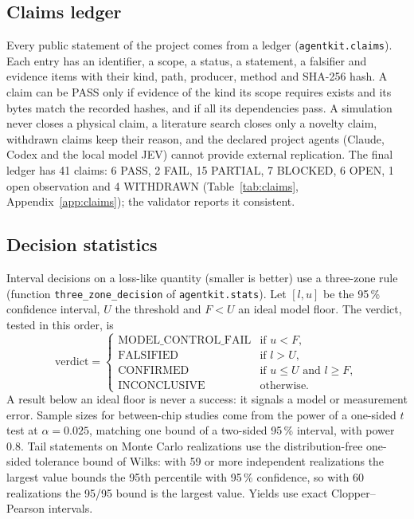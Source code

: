 \documentclass[11pt,a4paper]{article}
\begin{document}
\subsection{Claims ledger}

Every public statement of the project comes from a ledger (\texttt{agentkit.claims}). Each entry has an identifier, a scope, a status, a statement, a falsifier and evidence items with their kind, path, producer, method and SHA-256 hash. A claim can be PASS only if evidence of the kind its scope requires exists and its bytes match the recorded hashes, and if all its dependencies pass. A simulation never closes a physical claim, a literature search closes only a novelty claim, withdrawn claims keep their reason, and the declared project agents (Claude, Codex and the local model JEV) cannot provide external replication. The final ledger has 41 claims: 6 PASS, 2 FAIL, 15 PARTIAL, 7 BLOCKED, 6 OPEN, 1 open observation and 4 WITHDRAWN (Table~\ref{tab:claims}, Appendix~\ref{app:claims}); the validator reports it consistent.

\subsection{Decision statistics}

Interval decisions on a loss-like quantity (smaller is better) use a three-zone rule (function \texttt{three\_zone\_decision} of \texttt{agentkit.stats}). Let $[l,u]$ be the 95\,\% confidence interval, $U$ the threshold and $F<U$ an ideal model floor. The verdict, tested in this order, is
\begin{equation}
\text{verdict}=\begin{cases}
\text{MODEL\_CONTROL\_FAIL} & \text{if } u<F,\\
\text{FALSIFIED} & \text{if } l>U,\\
\text{CONFIRMED} & \text{if } u\le U \text{ and } l\ge F,\\
\text{INCONCLUSIVE} & \text{otherwise.}
\end{cases}
\label{eq:threezone}
\end{equation}
A result below an ideal floor is never a success: it signals a model or measurement error. Sample sizes for between-chip studies come from the power of a one-sided $t$ test at $\alpha=0.025$, matching one bound of a two-sided 95\,\% interval, with power 0.8. Tail statements on Monte Carlo realizations use the distribution-free one-sided tolerance bound of Wilks: with 59 or more independent realizations the largest value bounds the 95th percentile with 95\,\% confidence, so with 60 realizations the 95/95 bound is the largest value. Yields use exact Clopper--Pearson intervals.
\end{document}
